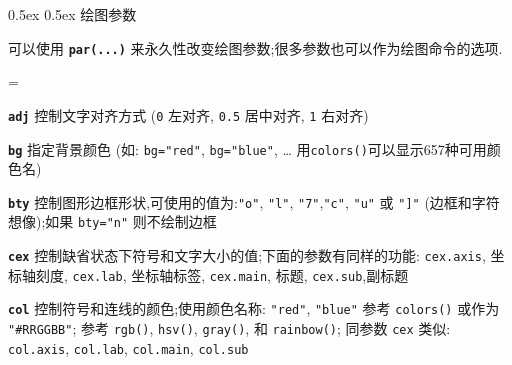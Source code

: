 \documentclass[landscape]{article}
\makeatletter
\renewcommand\section{\@startsection{section}{1}{0mm}%
                                     {0.5ex}%
                                     {0.5ex}%
                                {\color{black}\normalfont\large\bfseries}}
\newcommand{\code}{\texttt}
\newcommand{\bcode}[1]{\texttt{\textbf{#1}}}
\makeatother
\begin{document}
\begin{multicols*}{3}
\vspace{2mm}
\section{绘图参数}

可以使用 \bcode{par(...)} 来永久性改变绘图参数;很多参数也可以作为绘图命令的选项.


\everypar={\hangindent=9mm}

\bcode{adj}  控制文字对齐方式 (\code{0} 左对齐, \code{0.5} 居中对齐, \code{1} 右对齐)

\bcode{bg}  指定背景颜色 (如: \code{bg="red"}, \code{bg="blue"}, \ldots{} 用\code{colors()}可以显示657种可用颜色名)

\bcode{bty}  控制图形边框形状,可使用的值为:\code{"o"}, \code{"l"}, \code{"7"},\code{"c"}, \code{"u"} 或 \code{"]"}
(边框和字符想像);如果 \code{bty="n"} 则不绘制边框

\bcode{cex}  控制缺省状态下符号和文字大小的值;下面的参数有同样的功能: \code{cex.axis}, 坐标轴刻度, \code{cex.lab},
坐标轴标签, \code{cex.main}, 标题, \code{cex.sub},副标题

\bcode{col}  控制符号和连线的颜色;使用颜色名称: \code{"red"},
\code{"blue"} 参考 \code{colors()} 或作为 \code{"\#RRGGBB"};
参考 \code{rgb()}, \code{hsv()}, \code{gray()}, 和 \code{rainbow()}; 同参数 \code{cex} 类似:
 \code{col.axis}, \code{col.lab}, \code{col.main}, \code{col.sub}


\end{multicols*}
\end{document}
